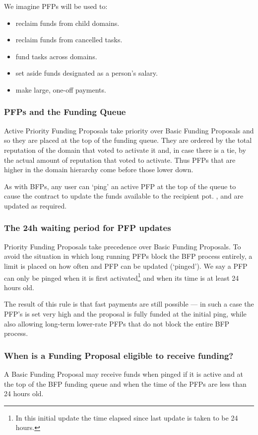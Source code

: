 We imagine PFPs will be used to:
\begin{itemize}
 \item reclaim funds from child domains.
 \item reclaim funds from cancelled tasks.
 \item fund tasks across domains.
 \item set aside funds designated as a person's salary.
 \item make large, one-off payments.
 \end{itemize}


\subsubsection{PFPs and the Funding Queue}

Active Priority Funding Proposals take priority over Basic Funding Proposals and so they are placed at the top of the funding queue. They are ordered by the total reputation of the domain that voted to activate it and, in case there is a tie, by the actual amount of reputation that voted to activate. Thus PFPs that are higher in the domain hierarchy come before those lower down.

As with BFPs, any user can `ping' an active PFP at the top of the queue to cause the contract to update the funds available to the recipient pot. ,  and  are updated as required.

\subsubsection{The 24h waiting period for PFP updates}
Priority Funding Proposals take precedence over Basic Funding Proposals. To avoid the situation in which long running PFPs block the BFP process entirely, a limit is placed on how often and PFP can be updated (`pinged'). We say a PFP can only be pinged when it is first activated\footnote{In this initial update the time elapsed since last update is taken to be 24 hours.} and when its  time is at least 24 hours old.

The result of this rule is that fast payments are still possible --- in such a case the PFP's  is set very high and the proposal is fully funded at the initial ping, while also allowing long-term lower-rate PFPs that do not block the entire BFP process.

\subsubsection{When is a Funding Proposal eligible to receive funding?}
A Basic Funding Proposal may receive funds when pinged if it is active and at the top of the BFP funding queue and when the  time of the PFPs are less than 24 hours old.

